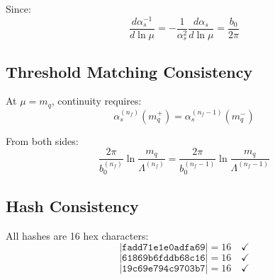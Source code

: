 \documentclass[11pt,a4paper]{article}
\theoremstyle{definition}
\begin{document}
Since:
\begin{equation}
\label{eq:rge-check-2}
\frac{d\alpha_s^{-1}}{d\ln\mu} = -\frac{1}{\alpha_s^2}\frac{d\alpha_s}{d\ln\mu} = \frac{b_0}{2\pi}
\end{equation}

\subsection{Threshold Matching Consistency}
\label{subsec:threshold-consistency}

At $\mu = m_q$, continuity requires:
\begin{equation}
\label{eq:thresh-check-1}
\alpha_s^{(n_f)}(m_q^+) = \alpha_s^{(n_f-1)}(m_q^-)
\end{equation}

From both sides:
\begin{equation}
\label{eq:thresh-check-2}
\frac{2\pi}{b_0^{(n_f)}}\ln\frac{m_q}{\Lambda^{(n_f)}} = \frac{2\pi}{b_0^{(n_f-1)}}\ln\frac{m_q}{\Lambda^{(n_f-1)}}
\end{equation}

\subsection{Hash Consistency}
\label{subsec:hash-consistency}

All hashes are 16 hex characters:
\begin{equation}
\label{eq:hash-check-v57}
|\texttt{fadd71e1e0adfa69}| = 16 \quad \checkmark
\end{equation}
\begin{equation}
\label{eq:hash-check-v56}
|\texttt{61869b6fddb68c16}| = 16 \quad \checkmark
\end{equation}
\begin{equation}
\label{eq:hash-check-v54}
|\texttt{19c69e794c9703b7}| = 16 \quad \checkmark
\end{equation}

\end{document}
